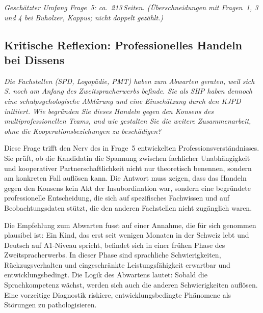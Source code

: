 \documentclass[ngerman, a4paper]{article}
\begin{document}
\textit{Geschätzter Umfang Frage~5: ca.~213\,Seiten.
(Überschneidungen mit Fragen~1, 3 und 4 bei Buholzer, Kappus; nicht doppelt gezählt.)}
 

 


\subsection{Kritische Reflexion: Professionelles Handeln bei Dissens}


\begin{tcolorbox}[colback=gray!5, colframe=gray!50, title=Weiterführende Diskurslinie]
\itshape
Die Fachstellen (SPD, Logopädie, PMT) haben zum Abwarten geraten, weil sich S.
noch am Anfang des Zweitspracherwerbs befinde. Sie als SHP haben dennoch eine
schulpsychologische Abklärung und eine Einschätzung durch den KJPD initiiert.
Wie begründen Sie dieses Handeln gegen den Konsens des multiprofessionellen
Teams, und wie gestalten Sie die weitere Zusammenarbeit, ohne die
Kooperationsbeziehungen zu beschädigen?
\end{tcolorbox}

Diese Frage trifft den Nerv des in Frage~5 entwickelten Professionsverständnisses.
Sie prüft, ob die Kandidatin die Spannung zwischen fachlicher Unabhängigkeit und
kooperativer Partnerschaftlichkeit nicht nur theoretisch benennen, sondern am
konkreten Fall auflösen kann. Die Antwort muss zeigen, dass das Handeln gegen
den Konsens kein Akt der Insubordination war, sondern eine begründete
professionelle Entscheidung, die sich auf spezifisches Fachwissen und auf
Beobachtungsdaten stützt, die den anderen Fachstellen nicht zugänglich waren.

Die Empfehlung zum Abwarten fusst auf einer Annahme, die für sich genommen
plausibel ist: Ein Kind, das erst seit wenigen Monaten in der Schweiz lebt und
Deutsch auf A1-Niveau spricht, befindet sich in einer frühen Phase des
Zweitspracherwerbs. In dieser Phase sind sprachliche Schwierigkeiten,
Rückzugsverhalten und eingeschränkte Leistungsfähigkeit erwartbar und
entwicklungsbedingt. Die Logik des Abwartens lautet: Sobald die Sprachkompetenz
wächst, werden sich auch die anderen Schwierigkeiten auflösen. Eine vorzeitige
Diagnostik riskiere, entwicklungsbedingte Phänomene als Störungen zu
pathologisieren.
\end{document}
